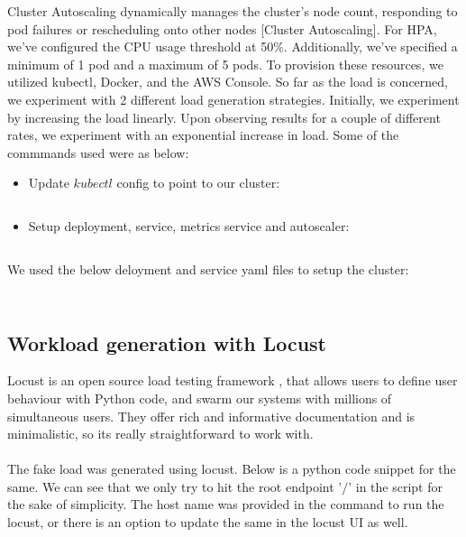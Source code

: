 \documentclass{article}
\begin{document}
Cluster Autoscaling dynamically manages the cluster's node count, responding to pod failures or rescheduling onto other nodes [Cluster Autoscaling]. For HPA, we've configured the CPU usage threshold at 50\%. Additionally, we've specified a minimum of 1 pod and a maximum of 5 pods. To provision these resources, we utilized kubectl, Docker, and the AWS Console. So far as the load is concerned, we experiment with 2 different load generation strategies. Initially, we experiment by increasing the load linearly. Upon observing results for a couple of different rates, we experiment with an exponential increase in load. 
Some of the commmands used were as below:
\begin{itemize}
    \item Update $kubectl$ config to point to our cluster:
    \inputminted{sh}{scripts/kubectl_config.sh}
    \item Setup deployment, service, metrics service and autoscaler:
    \inputminted{sh}{scripts/setup.sh}
\end{itemize}
\newpage
We used the below deloyment and service yaml files to setup the cluster:
\begin{figure}[H]
\centering
    \begin{minipage}{0.45\textwidth}
        \inputminted{yaml}{scripts/deployment.yaml}
    \end{minipage}
    \begin{minipage}{0.45\textwidth}
        \inputminted{yaml}{scripts/service.yaml}
    \end{minipage}
\end{figure}

\subsection{Workload generation with Locust}
Locust is an open source load testing framework \cite{locust}, that allows users to define user behaviour with Python code, and swarm our systems with millions of simultaneous users. They offer rich and informative documentation \cite{locust_docs} and is minimalistic, so its really straightforward to work with. \\\\
The fake load was generated using locust. Below is a python code snippet for the same. We can see that we only try to hit the root endpoint '$/$' in the script for the sake of simplicity. The host name was provided in the command to run the locust, or there is an option to update the same in the locust UI as well. 
\inputminted{py}{scripts/locustfile.py}
\end{document}

